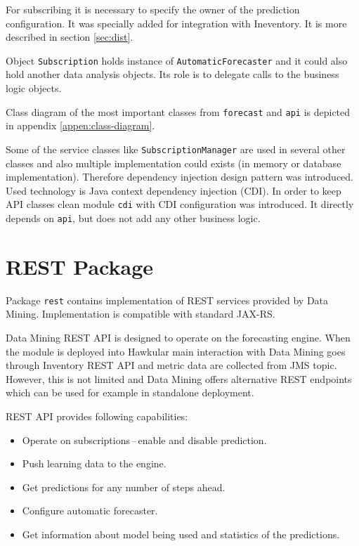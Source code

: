     For subscribing it is necessary to specify the owner of the prediction configuration. It was specially added for
    integration with Ineventory. It is more described in section \ref{sec:dist}.

    Object \texttt{Subscription} holds instance of \texttt{AutomaticForecaster} and it could also hold another
    data analysis objects. Its role is to delegate calls to the business logic objects.

    Class diagram of the most important classes from \texttt{forecast} and \texttt{api} is depicted in appendix
    \ref{appen:class-diagram}.

    Some of the service classes like \texttt{SubscriptionManager} are used in several other classes and also multiple
    implementation could exists (in memory or database implementation). Therefore dependency injection
    design pattern was introduced. Used technology is Java context dependency injection (CDI). In order to keep
    API classes clean module \texttt{cdi} with CDI configuration was introduced. It directly depends on \texttt{api},
    but does not add any other business logic.

    \section{REST Package}
    Package \texttt{rest} contains implementation of REST services provided by Data Mining. Implementation is
    compatible with standard JAX-RS.

    Data Mining REST API is designed to operate on the forecasting engine. When the module is deployed into Hawkular
    main interaction with Data Mining goes through Inventory REST API and metric data are collected from JMS topic.
    However, this is not limited and Data Mining offers alternative REST endpoints which can be used for
    example in standalone deployment.

    REST API provides following capabilities:

    \begin{itemize}
        \item Operate on subscriptions\,--\,enable and disable prediction.
        \item Push learning data to the engine.
        \item Get predictions for any number of steps ahead.
        \item Configure automatic forecaster.
        \item Get information about model being used and statistics of the predictions.
    \end{itemize}

